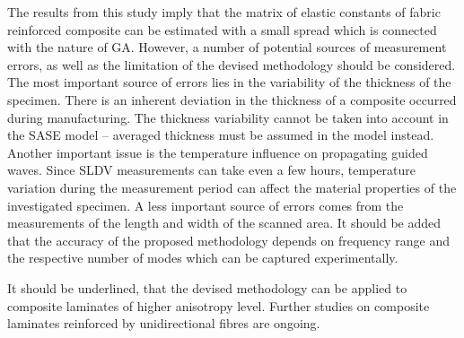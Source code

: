 \documentclass[preprint,12pt]{elsarticle}
\providecommand{\DIFaddtex}[1]{{\protect\color{blue}\uwave{#1}}} %
\providecommand{\DIFaddbegin}{} %
\providecommand{\DIFaddend}{} %
\providecommand{\DIFadd}[1]{\texorpdfstring{\DIFaddtex{#1}}{#1}} %
\begin{document}
	The results from this study imply that the matrix of elastic constants of fabric reinforced composite can be estimated with a \DIFaddbegin \DIFadd{quite }\DIFaddend small spread which is connected with the nature of GA. However, a number of potential sources of measurement errors, as well as the limitation of the devised methodology should be considered. The most important source of errors lies in the variability of the thickness of the specimen. There is an inherent deviation in the thickness of a composite occurred during manufacturing. The thickness variability cannot be taken into account in the SASE model -- averaged thickness must be assumed in the model instead. Another important issue is the temperature influence on propagating guided waves. Since SLDV measurements can take even a few hours, temperature variation during the measurement period can affect the material properties of the investigated specimen. A less important source of errors comes from the measurements of the length and width of the scanned area. It should be added that the accuracy of the proposed methodology depends on \DIFaddbegin \DIFadd{the }\DIFaddend frequency range and the respective number of modes which can be captured experimentally.

	It should be underlined, that the devised methodology can be applied to composite laminates of higher anisotropy level. Further studies on composite laminates reinforced by unidirectional fibres are ongoing.

	\appendix
\end{document}
